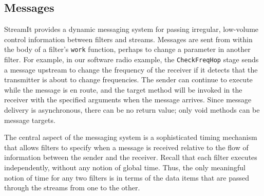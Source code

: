 \subsection{Messages}



StreamIt provides a dynamic messaging system for passing irregular,
low-volume control information between filters and streams.  Messages
are sent from within the body of a filter's \texttt{work} function,
perhaps to change a parameter in another filter.  For example, in our
software radio example, the
\texttt{CheckFreqHop} stage sends a message upstream to change the
frequency of the receiver if it detects that the transmitter is about
to change frequencies.  The sender can continue to execute while the
message is en route, and the target method will be invoked
in the receiver with the specified arguments when the message
arrives.  Since message delivery is asynchronous, there can be no
return value; only void methods can be message targets.

The central aspect of the messaging system is a
sophisticated timing  mechanism that allows filters to  specify when a
message is  received relative to  the flow of information  between the
sender   and  the   receiver.   Recall   that  each   filter  executes
independently,  without any  notion of  global time.   Thus,  the only
meaningful notion of time for any two filters is in terms of the data
items that are passed through the streams from one to the other.

